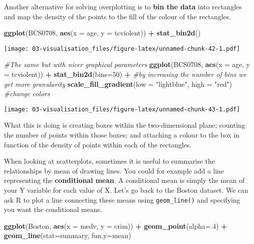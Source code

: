 \documentclass[
]{book}
\newenvironment{Shaded}{\begin{snugshade}}{\end{snugshade}}
\newcommand{\AttributeTok}[1]{\textcolor[rgb]{0.13,0.29,0.53}{#1}}
\newcommand{\CommentTok}[1]{\textcolor[rgb]{0.56,0.35,0.01}{\textit{#1}}}
\newcommand{\DecValTok}[1]{\textcolor[rgb]{0.00,0.00,0.81}{#1}}
\newcommand{\FunctionTok}[1]{\textcolor[rgb]{0.13,0.29,0.53}{\textbf{#1}}}
\newcommand{\NormalTok}[1]{#1}
\newcommand{\SpecialCharTok}[1]{\textcolor[rgb]{0.81,0.36,0.00}{\textbf{#1}}}
\newcommand{\StringTok}[1]{\textcolor[rgb]{0.31,0.60,0.02}{#1}}
\begin{document}
Another alternative for solving overplotting is to \textbf{bin the data} into rectangles and map the density of the points to the fill of the colour of the rectangles.

\begin{Shaded}
\begin{Highlighting}[]
\FunctionTok{ggplot}\NormalTok{(BCS0708, }\FunctionTok{aes}\NormalTok{(}\AttributeTok{x =}\NormalTok{ age, }\AttributeTok{y =}\NormalTok{ tcviolent)) }\SpecialCharTok{+} 
  \FunctionTok{stat\_bin2d}\NormalTok{()}
\end{Highlighting}
\end{Shaded}

\texttt{[image: 03-visualisation\_files/figure-latex/unnamed-chunk-42-1.pdf]}

\begin{Shaded}
\begin{Highlighting}[]
\CommentTok{\#The same but with nicer graphical parameters}
\FunctionTok{ggplot}\NormalTok{(BCS0708, }\FunctionTok{aes}\NormalTok{(}\AttributeTok{x =}\NormalTok{ age, }\AttributeTok{y =}\NormalTok{ tcviolent)) }\SpecialCharTok{+}
  \FunctionTok{stat\_bin2d}\NormalTok{(}\AttributeTok{bins=}\DecValTok{50}\NormalTok{) }\SpecialCharTok{+} \CommentTok{\#by increasing the number of bins we get more granularity}
  \FunctionTok{scale\_fill\_gradient}\NormalTok{(}\AttributeTok{low =} \StringTok{"lightblue"}\NormalTok{, }\AttributeTok{high =} \StringTok{"red"}\NormalTok{) }\CommentTok{\#change colors}
\end{Highlighting}
\end{Shaded}

\texttt{[image: 03-visualisation\_files/figure-latex/unnamed-chunk-43-1.pdf]}

What this is doing is creating boxes within the two-dimensional plane; counting the number of points within those boxes; and attaching a colour to the box in function of the density of points within each of the rectangles.

When looking at scatterplots, sometimes it is useful to summarise the relationships by mean of drawing lines. You could for example add a line representing the \textbf{conditional mean}. A conditional mean is simply the mean of your Y variable for each value of X. Let's go back to the Boston dataset. We can ask R to plot a line connecting these means using \texttt{geom\_line()} and specifying you want the conditional means.

\begin{Shaded}
\begin{Highlighting}[]
\FunctionTok{ggplot}\NormalTok{(Boston, }\FunctionTok{aes}\NormalTok{(}\AttributeTok{x =}\NormalTok{ medv, }\AttributeTok{y =}\NormalTok{ crim)) }\SpecialCharTok{+}
  \FunctionTok{geom\_point}\NormalTok{(}\AttributeTok{alpha=}\NormalTok{.}\DecValTok{4}\NormalTok{) }\SpecialCharTok{+}
  \FunctionTok{geom\_line}\NormalTok{(}\AttributeTok{stat=}\StringTok{\textquotesingle{}summary\textquotesingle{}}\NormalTok{, }\AttributeTok{fun.y=}\NormalTok{mean)}
\end{Highlighting}
\end{Shaded}
\end{document}
